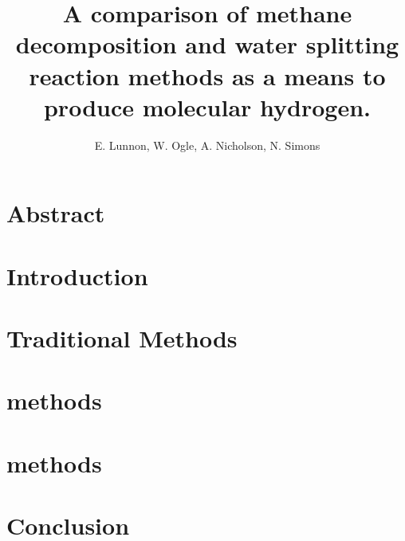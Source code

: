 \documentclass[a4paper]{article}
\title{A comparison of methane decomposition and water splitting reaction methods as a means to produce molecular hydrogen.}
\author{E. Lunnon, W. Ogle, A. Nicholson, N. Simons}
\begin{document}
\maketitle
\tableofcontents
\clearpage

\begin{multicols}{2}
\section*{Abstract}%
\label{sec:abstract}


\clearpage

\section{Introduction}%
\label{sec:introduction}


\section{Traditional Methods}%
\label{sub:Traditional_Methods}


\section{ methods}%
\label{sub:ch4_methods}


\section{ methods}%
\label{sub:h2o_methods}


\section{Conclusion}%
\label{sec:conclusion}


%



\end{multicols}
\end{document}
